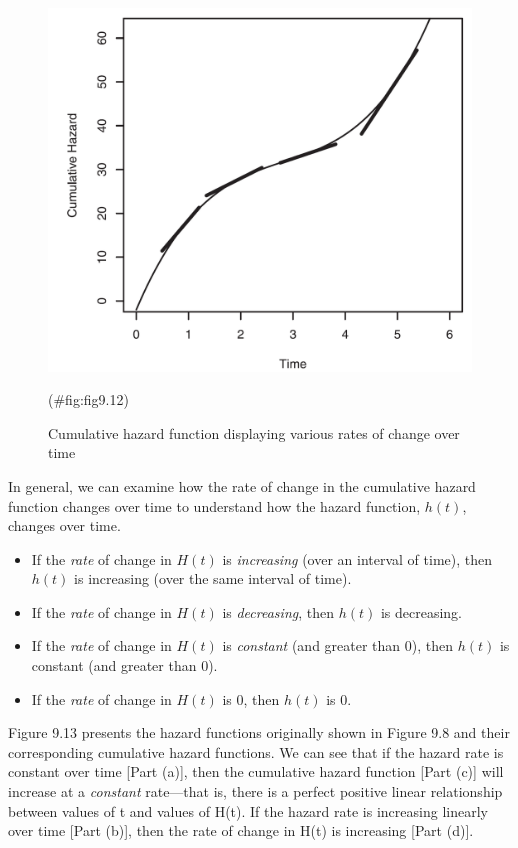 \documentclass[
]{report}
\providecommand{\tightlist}{%
  \setlength{\itemsep}{0pt}\setlength{\parskip}{0pt}}
\begin{document}
\begin{figure}

{\centering \includegraphics[width=1\linewidth]{docs/Fig9_12} 

}

\caption{Cumulative hazard function displaying various rates of change over time}(\#fig:fig9.12)
\end{figure}

In general, we can examine how the rate of change in the cumulative hazard function changes over time to understand how the hazard function, \(h(t)\), changes over time.

\begin{itemize}
\tightlist
\item
  If the \emph{rate} of change in \(H(t)\) is \emph{increasing} (over an interval of time), then \(h(t)\) is increasing (over the same interval of time).
\item
  If the \emph{rate} of change in \(H(t)\) is \emph{decreasing}, then \(h(t)\) is decreasing.\\
\item
  If the \emph{rate} of change in \(H(t)\) is \emph{constant} (and greater than 0), then \(h(t)\) is constant (and greater than 0).\\
\item
  If the \emph{rate} of change in \(H(t)\) is 0, then \(h(t)\) is 0.
\end{itemize}

Figure 9.13 presents the hazard functions originally shown in Figure 9.8 and their corresponding cumulative hazard functions. We can see that if the hazard rate is constant over time {[}Part (a){]}, then the cumulative hazard function {[}Part (c){]} will increase at a \emph{constant} rate---that is, there is a perfect positive linear relationship between values of t and values of H(t). If the hazard rate is increasing linearly over time {[}Part (b){]}, then the rate of change in H(t) is increasing {[}Part (d){]}.
\end{document}
